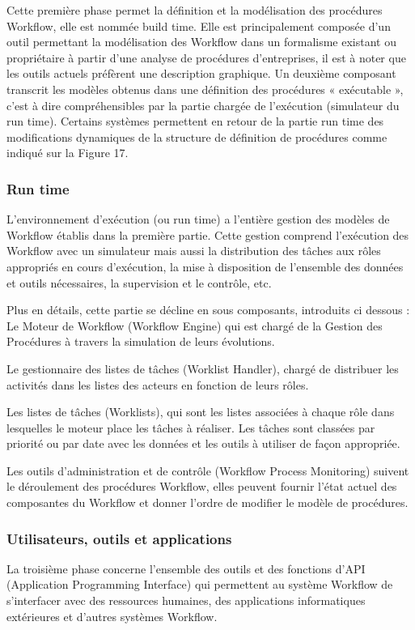  	 Cette première phase permet la définition et la modélisation des procédures Workflow, elle est nommée build time. Elle est principalement composée d’un outil permettant la modélisation des Workflow dans un formalisme existant ou propriétaire à partir d’une analyse de procédures d’entreprises, il est à noter que les outils actuels préfèrent une description graphique. Un deuxième composant transcrit les modèles obtenus dans une définition des procédures « exécutable », c’est à dire compréhensibles par la partie chargée de l’exécution (simulateur du run time). Certains systèmes permettent en retour de la partie run time des modifications dynamiques de la structure de définition de procédures comme indiqué sur la Figure 17. 
 	  	 \subsubsection{ Run time }
 	 L’environnement d’exécution (ou run time) a l’entière gestion des modèles de Workflow établis dans la première partie. Cette gestion comprend l’exécution des Workflow avec un simulateur mais aussi la distribution des tâches aux rôles appropriés en cours d’exécution, la mise à disposition de l’ensemble des données et outils nécessaires, la supervision et le contrôle, etc.
 	 
 	 Plus en détails, cette partie se décline en sous composants, introduits ci dessous : Le Moteur de Workflow (Workflow Engine) qui est chargé de la Gestion des Procédures à travers la simulation de leurs évolutions. 
 	 
 	 Le gestionnaire des listes de tâches (Worklist Handler), chargé de distribuer les activités dans les listes des acteurs en fonction de leurs rôles. 
 	 
 	 Les listes de tâches (Worklists), qui sont les listes associées à chaque rôle dans lesquelles le moteur place les tâches à réaliser. Les tâches sont classées par priorité ou par date avec les données et les outils à utiliser de façon appropriée. 
 	 
 	 
 	 Les outils d’administration et de contrôle (Workflow Process Monitoring) suivent le déroulement des procédures Workflow, elles peuvent fournir l’état actuel des composantes du Workflow et donner l’ordre de modifier le modèle de procédures.
 	 
 	  	  	 \subsubsection{ Utilisateurs, outils et applications }
 	  	  	 La troisième phase concerne l’ensemble des outils et des fonctions d’API (Application Programming Interface) qui permettent au système Workflow de s’interfacer avec des ressources humaines, des applications informatiques extérieures et d’autres systèmes Workflow. 
 	  	  	 
